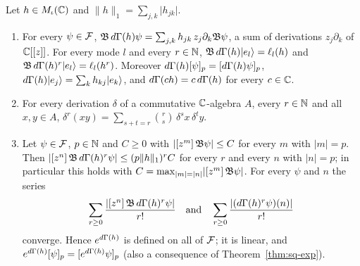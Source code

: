 \begin{vetdenv}
\begin{lemma}\label{lem:sq-dgamma}
Let $h\in M_\iota(\mathbb C)$ and $\lVert h\rVert_1=\sum_{j,k}\lvert h_{jk}\rvert$.
\begin{enumerate}
\item[(a)] For every $\psi\in\mathcal F$, $\mathfrak B\,d\Gamma(h)\psi=\sum_{j,k}h_{jk}\,z_j\partial_k\mathfrak B\psi$, a sum of derivations
$z_j\partial_k$ of $\mathbb C[[z]]$. For every mode $l$ and every $r\in\mathbb N$, $\mathfrak B\,d\Gamma(h)\lvert e_l\rangle=\ell_l(h)$ and
$\mathfrak B\,d\Gamma(h)^r\lvert e_l\rangle=\ell_l(h^r)$. Moreover $d\Gamma(h)[\psi]_p=[d\Gamma(h)\psi]_p$, $d\Gamma(h)\lvert e_j\rangle=\sum_kh_{kj}\lvert e_k\rangle$,
and $d\Gamma(ch)=c\,d\Gamma(h)$ for every $c\in\mathbb C$.
\item[(b)] For every derivation $\delta$ of a commutative $\mathbb C$-algebra $A$, every $r\in\mathbb N$
and all $x,y\in A$, $\delta^r(xy)=\sum_{s+t=r}\binom rs\,\delta^sx\,\delta^ty$.
\item[(c)] Let $\psi\in\mathcal F$, $p\in\mathbb N$ and $C\ge0$ with $\lvert[z^{m}]\,\mathfrak B\psi\rvert\le C$ for every $m$ with
$\lvert m\rvert=p$. Then $\lvert[z^{n}]\,\mathfrak B\,d\Gamma(h)^r\psi\rvert\le(p\lVert h\rVert_1)^rC$ for every $r$ and every $n$
with $\lvert n\rvert=p$; in particular this holds with $C=\max_{\lvert m\rvert=\lvert n\rvert}\lvert[z^{m}]\,\mathfrak B\psi\rvert$.
For every $\psi$ and $n$ the series
\[
 \sum_{r\ge0}\frac{\lvert[z^{n}]\,\mathfrak B\,d\Gamma(h)^r\psi\rvert}{r!}\quad\text{and}\quad
 \sum_{r\ge0}\frac{\lvert(d\Gamma(h)^r\psi)(n)\rvert}{r!}
\]
converge. Hence $e^{d\Gamma(h)}$ is defined on all of $\mathcal F$; it is linear, and
$e^{d\Gamma(h)}[\psi]_p=[e^{d\Gamma(h)}\psi]_p$ (also a consequence of Theorem~\ref{thm:sq-exp}).
\end{enumerate}
\end{lemma}


\end{vetdenv}
